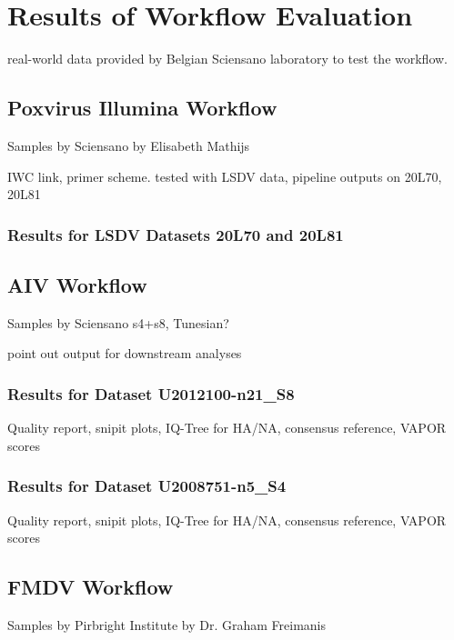 \chapter{Results of Workflow Evaluation}\label{chap:results}

real-world data provided by Belgian Sciensano laboratory to test the workflow.

\section{Poxvirus Illumina Workflow}
Samples by Sciensano by Elisabeth Mathijs

IWC link, primer scheme.
tested with LSDV data,
pipeline outputs on 20L70, 20L81

\subsection{Results for LSDV Datasets 20L70 and 20L81}

\section{AIV Workflow}
Samples by Sciensano s4+s8, Tunesian?

point out output for downstream analyses

\subsection{Results for Dataset U2012100-n21\_S8} %
Quality report, snipit plots, IQ-Tree for HA/NA, consensus reference, VAPOR scores

\subsection{Results for Dataset U2008751-n5\_S4}
Quality report, snipit plots, IQ-Tree for HA/NA, consensus reference, VAPOR scores

\section{FMDV Workflow}
Samples by Pirbright Institute by Dr. Graham Freimanis